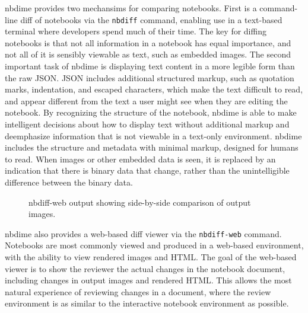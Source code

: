\documentclass{deliverablereport}
\begin{document}
nbdime provides two mechansims for comparing notebooks. First is a command-line diff of notebooks
via the \texttt{nbdiff} command, enabling use in a text-based terminal where developers spend much
of their time. The key for diffing notebooks is that not all information in a notebook has equal
importance, and not all of it is sensibly viewable as text, such as embedded images. The second
important task of nbdime is displaying text content in a more legible form than the raw JSON. JSON
includes additional structured markup, such as quotation marks, indentation, and escaped
characters, which make the text difficult to read, and appear different from the text a user might
see when they are editing the notebook. By recognizing the structure of the notebook, nbdime is
able to make intelligent decisions about how to display text without additional markup and deemphasize information that is not viewable in a text-only environment.
nbdime includes the structure and metadata with minimal markup, designed for humans to read.
When images or other embedded data is seen, it is replaced by an indication that there is binary data that change, rather than the unintelligible difference between the binary data.

\begin{figure}
    \center
    \caption{nbdiff-web output showing side-by-side comparison of output images.}
    \label{fig:nbdiff-web}
\end{figure}

nbdime also provides a web-based diff viewer via the \texttt{nbdiff-web} command. Notebooks are
most commonly viewed and produced in a web-based environment, with the ability to view rendered
images and HTML. The goal of the web-based viewer is to show the reviewer the actual changes in the
notebook document, including changes in output images and rendered HTML.
This allows the most natural experience of reviewing changes in a document, where the review environment is as similar to the interactive notebook environment as possible.
\end{document}
